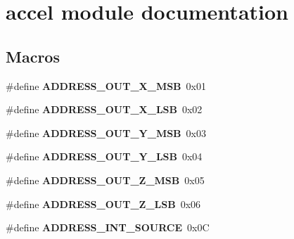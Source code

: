 \hypertarget{group__accel__module}{}\section{accel module documentation}
\label{group__accel__module}
\subsection*{Macros}
\begin{DoxyCompactItemize}
\item 
\hypertarget{group__accel__module_ga1bc789dd23d29046c0f3ca271c90de46}{}\#define {\bfseries A\+D\+D\+R\+E\+S\+S\+\_\+\+O\+U\+T\+\_\+\+X\+\_\+\+M\+S\+B}~0x01\label{group__accel__module_ga1bc789dd23d29046c0f3ca271c90de46}

\item 
\hypertarget{group__accel__module_gac241f4b556e4612da1bccb0b7eae251f}{}\#define {\bfseries A\+D\+D\+R\+E\+S\+S\+\_\+\+O\+U\+T\+\_\+\+X\+\_\+\+L\+S\+B}~0x02\label{group__accel__module_gac241f4b556e4612da1bccb0b7eae251f}

\item 
\hypertarget{group__accel__module_ga7f6486920ac182271af3285b8c0b169e}{}\#define {\bfseries A\+D\+D\+R\+E\+S\+S\+\_\+\+O\+U\+T\+\_\+\+Y\+\_\+\+M\+S\+B}~0x03\label{group__accel__module_ga7f6486920ac182271af3285b8c0b169e}

\item 
\hypertarget{group__accel__module_ga2e1d7eb43e141d583b0e276219b84f21}{}\#define {\bfseries A\+D\+D\+R\+E\+S\+S\+\_\+\+O\+U\+T\+\_\+\+Y\+\_\+\+L\+S\+B}~0x04\label{group__accel__module_ga2e1d7eb43e141d583b0e276219b84f21}

\item 
\hypertarget{group__accel__module_ga25b0e9ce86c29dd0f7768ba8afec1aaa}{}\#define {\bfseries A\+D\+D\+R\+E\+S\+S\+\_\+\+O\+U\+T\+\_\+\+Z\+\_\+\+M\+S\+B}~0x05\label{group__accel__module_ga25b0e9ce86c29dd0f7768ba8afec1aaa}

\item 
\hypertarget{group__accel__module_ga40bdfae04754fa2136e764575643d61f}{}\#define {\bfseries A\+D\+D\+R\+E\+S\+S\+\_\+\+O\+U\+T\+\_\+\+Z\+\_\+\+L\+S\+B}~0x06\label{group__accel__module_ga40bdfae04754fa2136e764575643d61f}

\item 
\hypertarget{group__accel__module_gac8e459a68b69415ef270a53cdcccf6e2}{}\#define {\bfseries A\+D\+D\+R\+E\+S\+S\+\_\+\+I\+N\+T\+\_\+\+S\+O\+U\+R\+C\+E}~0x0\+C\label{group__accel__module_gac8e459a68b69415ef270a53cdcccf6e2}


\end{DoxyCompactItemize}

